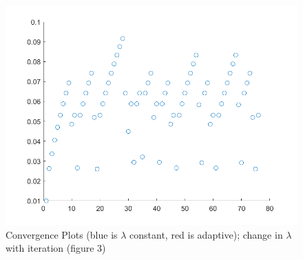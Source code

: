 \documentclass[11pt, a4paper]{article}
\theoremstyle{definition}
\begin{document}
\begin{figure}[h]
	\includegraphics[scale=0.4]{lambdaVec10.png}
	\caption{Convergence Plots (blue is $\lambda$ constant, red is adaptive); change in $\lambda$ with iteration (figure 3)} 
	\label{F3}
\end{figure}
	
\end{document}
